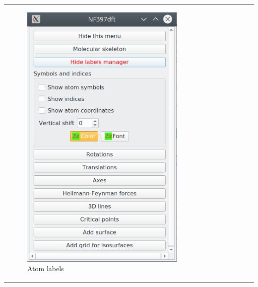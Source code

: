\documentclass[10pt]{article}
\begin{document}
\begin{tabular}{lcr}
\begin{minipage}{.3\linewidth}
\begin{figure}[H]
\begin{center}
            \includegraphics[width=0.8\linewidth]{damqt320_atom_labels.png}
        \end{center}
        \vspace*{11mm}
        \caption{Atom labels \label{fig:4_13_2_1}}
    \end{figure}
\end{minipage}
&
\begin{minipage}{.3\linewidth}
\begin{figure}[H]
    \begin{center}

\end{center}
\end{figure}
\end{minipage}
\end{tabular}
\end{document}
